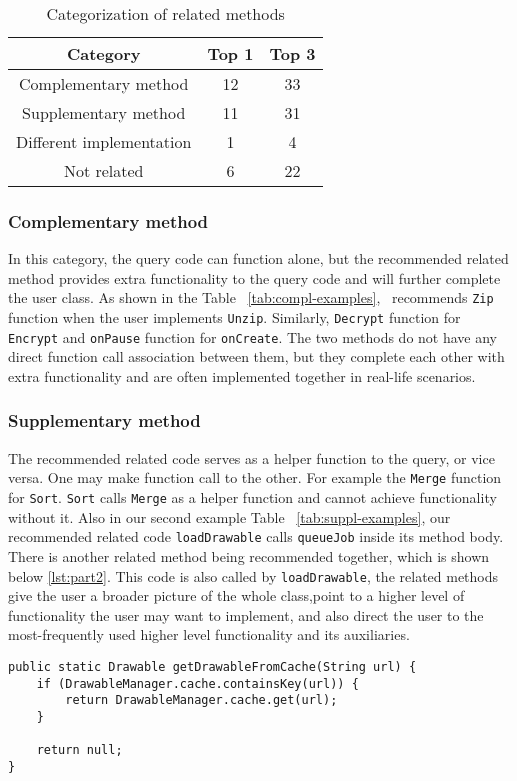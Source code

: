 \begin{table}
	\begin{center}
		\begin{tabular}{ c|c|c } 
			Category & Top 1 & Top 3 \\\hline
			Complementary method &  12 & 33\\\hline 
			Supplementary method &  11 & 31 \\ \hline
			Different implementation &  1 & 4 \\ \hline
			Not related & 6 & 22
		\end{tabular}		
	\end{center}
	\caption{Categorization of related methods}
	\label{tab:categorization}
\end{table}
	
	

\subsubsection{Complementary method} In this category, the query code can function alone, but the recommended related method provides extra functionality to the query code and will further complete the user class. As shown in the Table ~\ref{tab:compl-examples}, \tool\ recommends \texttt{Zip} function when the user implements \texttt{Unzip}. Similarly, \texttt{Decrypt} function for \texttt{Encrypt} and \texttt{onPause} function for \texttt{onCreate}. The two methods do not have any direct function call association between them, but they complete each other with extra functionality and are often implemented together in real-life scenarios. 

\subsubsection{Supplementary method} The recommended related code serves as a helper function to the query, or vice versa. One may make function call to the other. For example the \texttt{Merge} function for \texttt{Sort}. \texttt{Sort} calls \texttt{Merge} as a helper function and cannot achieve functionality without it. Also in our second example Table ~\ref{tab:suppl-examples}, our recommended related code \texttt{loadDrawable} calls \texttt{queueJob} inside its method body. There is another related method being recommended together, which is shown below \ref{lst:part2}. This code is also called by \texttt{loadDrawable}, the related methods give the user a broader picture of the whole class,point to a higher level of functionality the user may want to implement, and also direct the user to the most-frequently used higher level functionality and its auxiliaries.
\begin{lstlisting}[caption={Recommended code \#2}, label={lst:part2}]
public static Drawable getDrawableFromCache(String url) {
	if (DrawableManager.cache.containsKey(url)) {
		return DrawableManager.cache.get(url);
	}
	
	return null;
}	
\end{lstlisting}

